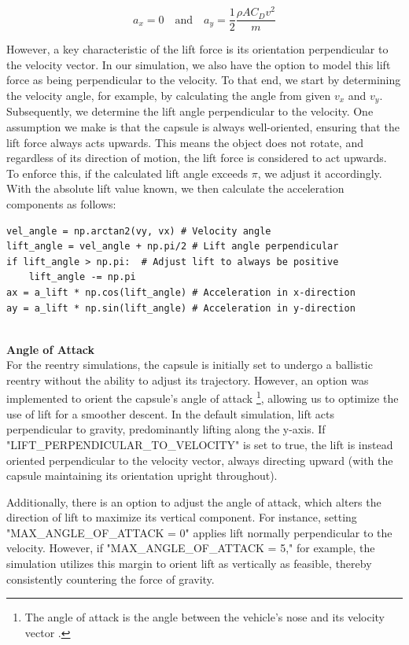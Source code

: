 \documentclass[runningheads]{llncs}
\begin{document}
\begin{equation}
a_x = 0 \quad \text{and} \quad a_y = \frac{1}{2} \frac{\rho A C_D v^2}{m}
\end{equation}


However, a key characteristic of the lift force is its orientation perpendicular to the velocity vector. In our simulation, we also have the option to model this lift force as being perpendicular to the velocity. To that end, we start by determining the velocity angle, for example, by calculating the angle from given \( v_x \) and \( v_y \). Subsequently, we determine the lift angle perpendicular to the velocity. One assumption we make is that the capsule is always well-oriented, ensuring that the lift force always acts upwards. This means the object does not rotate, and regardless of its direction of motion, the lift force is considered to act upwards. To enforce this, if the calculated lift angle exceeds \(\pi\), we adjust it accordingly. With the absolute lift value known, we then calculate the acceleration components as follows:

\begin{verbatim}
vel_angle = np.arctan2(vy, vx) # Velocity angle
lift_angle = vel_angle + np.pi/2 # Lift angle perpendicular
if lift_angle > np.pi:  # Adjust lift to always be positive   
    lift_angle -= np.pi 
ax = a_lift * np.cos(lift_angle) # Acceleration in x-direction
ay = a_lift * np.sin(lift_angle) # Acceleration in y-direction
\end{verbatim}


\textbf{\\Angle of Attack\\}
For the reentry simulations, the capsule is initially set to undergo a ballistic reentry without the ability to adjust its trajectory. However, an option was implemented to orient the capsule's angle of attack \footnote{The angle of attack is the angle between the vehicle’s nose and its velocity vector \cite{returning_space}.}, allowing us to optimize the use of lift for a smoother descent. In the default simulation, lift acts perpendicular to gravity, predominantly lifting along the y-axis. If "LIFT\_PERPENDICULAR\_TO\_VELOCITY" is set to true, the lift is instead oriented perpendicular to the velocity vector, always directing upward (with the capsule maintaining its orientation upright throughout).

 Additionally, there is an option to adjust the angle of attack, which alters the direction of lift to maximize its vertical component. For instance, setting "MAX\_ANGLE\_OF\_ATTACK = 0" applies lift normally perpendicular to the velocity. However, if "MAX\_ANGLE\_OF\_ATTACK = 5," for example, the simulation utilizes this margin to orient lift as vertically as feasible, thereby consistently countering the force of gravity.
\end{document}
